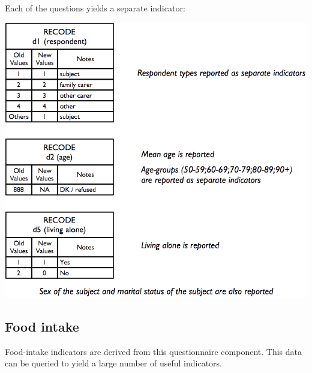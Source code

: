 \documentclass[12pt,a4paper]{book}
\theoremstyle{definition}
\theoremstyle{definition}
\theoremstyle{definition}
\theoremstyle{remark}
\begin{document}
\newpage

Each of the questions yields a separate indicator:

\begin{center}\includegraphics[width=9.76in]{figures/indicators03} \end{center}

\hypertarget{food-intake}{%
\subsection{Food intake}\label{food-intake}}

Food-intake indicators are derived from this questionnaire component.
This data can be queried to yield a large number of useful indicators.

\newpage
\end{document}
